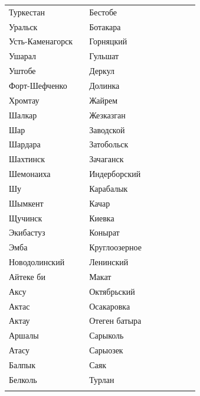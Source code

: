 \documentclass[12pt, a4paper]{article}
\begin{document}
\begin{figure}[t]
\scriptsize 
\begin{tabular}[b]{ V{2.8} m{2.0cm} V{2.8} m{6.2cm} V{2.8} m{2.0cm} V{2.8}  m{8.0cm }V{2.8}} 
Туркестан &  & Бестобе &  \\ [0.45cm]
Уральск &  & Ботакара &  \\ [0.45cm]
Усть-Каменагорск &  & Горняцкий &  \\ [0.45cm]
Ушарал &  & Гульшат &  \\ [0.45cm]
Уштобе &  & Деркул &  \\ [0.45cm]
Форт-Шефченко &  & Долинка &  \\ [0.45cm]
Хромтау &  & Жайрем &  \\ [0.45cm]
Шалкар &  & Жезказган &  \\ [0.45cm]
Шар &  & Заводской &  \\ [0.45cm]
Шардара &  & Затобольск &  \\ [0.45cm]
Шахтинск &  & Зачаганск &  \\ [0.45cm]
Шемонаиха &  & Индерборский &  \\ [0.45cm]
Шу &  & Карабалык &  \\ [0.45cm]
Шымкент &  & Качар &  \\ [0.45cm]
Щучинск &  & Киевка &  \\ [0.45cm]
Экибастуз &  & Конырат &  \\ [0.45cm]
Эмба &  & Круглоозерное &  \\ [0.45cm]
Новодолинский &  & Ленинский &  \\ [0.45cm]
Айтеке би &  & Макат &  \\ [0.45cm]
Аксу &  & Октябрьский &  \\ [0.45cm]
Актас &  & Осакаровка &  \\ [0.45cm]
Актау &  & Отеген батыра &  \\ [0.45cm]
Аршалы &  & Сарыколь &  \\ [0.45cm]
Атасу &  & Сарыозек &  \\ [0.45cm]
Балпык &  & Саяк &  \\ [0.45cm]
Белколь &  & Турлан &  \\ [0.45cm]
\end{tabular}
\end{figure}
\end{document}
